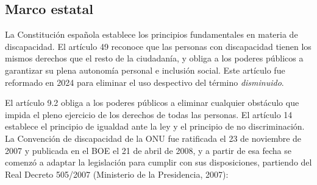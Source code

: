\subsection{Marco estatal}

La Constitución española establece los principios fundamentales en materia de discapacidad. El artículo 49 reconoce que las personas con discapacidad tienen los mismos derechos que el resto de la ciudadanía, y obliga a los poderes públicos a garantizar su plena autonomía personal e inclusión social. Este artículo fue reformado en 2024 para eliminar el uso despectivo del término \textit{disminuido}.

El artículo 9.2 obliga a los poderes públicos a eliminar cualquier obstáculo que impida el pleno ejercicio de los derechos de todas las personas. El artículo 14 establece el principio de igualdad ante la ley y el principio de no discriminación.
\\

La Convención de discapacidad de la ONU fue ratificada el 23 de noviembre de 2007 y publicada en el BOE el 21 de abril de 2008, y a partir de esa fecha se comenzó a adaptar la legislación para cumplir con sus disposiciones, partiendo del Real Decreto 505/2007 (Ministerio de la Presidencia, 2007):

